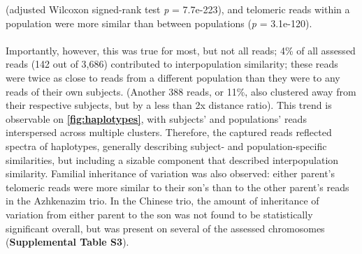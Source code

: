 \documentclass{article}
\begin{document}
                (adjusted Wilcoxon signed-rank test \textit{p} = 7.7e-223),
            and telomeric reads within a population were more similar than between populations
                (\textit{p} = 3.1e-120).
        ~\\
        
        ~\\
        Importantly, however, this was true for most, but not all reads;
            4\% of all assessed reads (142 out of 3,686) contributed to interpopulation similarity;
                these reads were twice as close to reads from a different population than they were to any reads of their own subjects.
            (Another 388 reads, or 11\%, also clustered away from their respective subjects, but by a less than 2x distance ratio).
            This trend is observable on \textbf{\autoref{fig:haplotypes}},
                with subjects' and populations' reads interspersed across multiple clusters.
        Therefore, the captured reads reflected spectra of haplotypes,
            generally describing subject- and population-specific similarities,
            but including a sizable component that described interpopulation similarity.
        Familial inheritance of variation was also observed:
            either parent's telomeric reads were more similar to their son's than to the other parent's reads in the Azhkenazim trio.
            In the Chinese trio,
                the amount of inheritance of variation from either parent to the son was not found to be statistically significant overall,
                but was present on several of the assessed chromosomes (\textbf{Supplemental Table S3}).
\end{document}
